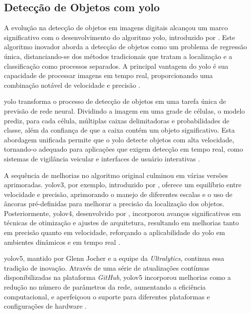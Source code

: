  

 \subsection{Detecção de Objetos com \gls{yolo}}\label{subsec:yolo}

A evolução na detecção de objetos em imagens digitais alcançou um marco significativo com o desenvolvimento do algoritmo \gls{yolo}, introduzido por . Este algoritmo inovador aborda a detecção de objetos como um problema de regressão única, distanciando-se dos métodos tradicionais que tratam a localização e a classificação como processos separados. A principal vantagem do \gls{yolo} é sua capacidade de processar imagens em tempo real, proporcionando uma combinação notável de velocidade e precisão \cite{Redmon2016YOLO}.

\gls{yolo} transforma o processo de detecção de objetos em uma tarefa única de previsão de rede neural. Dividindo a imagem em uma grade de células, o modelo prediz, para cada célula, múltiplas caixas delimitadoras e probabilidades de classe, além da confiança de que a caixa contém um objeto significativo. Esta abordagem unificada permite que o \gls{yolo} detecte objetos com alta velocidade, tornando-o adequado para aplicações que exigem detecção em tempo real, como sistemas de vigilância veicular e interfaces de usuário interativas \cite{Redmon2016YOLO}.

A sequência de melhorias no algoritmo original culminou em várias versões aprimoradas. \gls{yolo}v3, por exemplo, introduzido por , oferece um equilíbrio entre velocidade e precisão, aprimorando o manejo de diferentes escalas e o uso de âncoras pré-definidas para melhorar a precisão da localização dos objetos. Posteriormente, \gls{yolo}v4, desenvolvido por , incorporou avanços significativos em técnicas de otimização e ajustes de arquitetura, resultando em melhorias tanto em precisão quanto em velocidade, reforçando a aplicabilidade do \gls{yolo} em ambientes dinâmicos e em tempo real \cite{Bochkovskiy2020YOLOv4}.

\gls{yolo}v5, mantido por Glenn Jocher e a equipe da \textit{Ultralytics}, continua essa tradição de inovação. Através de uma série de atualizações contínuas disponibilizadas na plataforma \textit{GitHub}, \gls{yolo}v5 incorporou melhorias como a redução no número de parâmetros da rede, aumentando a eficiência computacional, e aperfeiçoou o suporte para diferentes plataformas e configurações de hardware \cite{Jocher2021YOLOv5}.

